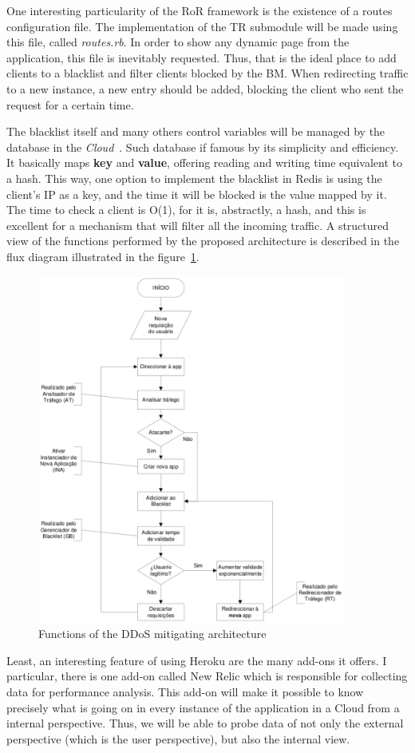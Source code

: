 One interesting particularity of the RoR framework is the existence of a routes configuration file. The implementation of the TR submodule will be made using this file, called \textit{routes.rb}. In order to show any dynamic page from the application, this file is inevitably requested. Thus, that is the ideal place to add clients to a blacklist and filter clients blocked by the BM. When redirecting traffic to a new instance, a new entry should be added, blocking the client who sent the request for a certain time.

The blacklist itself and many others control variables will be managed by the database in the \emph{Cloud}~\cite{redis}. Such database if famous by its simplicity and efficiency. It basically maps \textbf{key} and \textbf{value}, offering reading and writing time equivalent to a hash. This way, one option to implement the blacklist in Redis is using the client's IP as a key, and the time it will be blocked is the value mapped by it. The time to check a client is O(1), for it is, abstractly, a hash, and this is excellent for a mechanism that will filter all the incoming traffic. A structured view of the functions performed by the proposed architecture is described in the flux diagram illustrated in the figure~\ref{fig:dfd}.

\begin{figure}[t!]
	\centering
	\includegraphics[width=0.90\textwidth]{images/dfd.eps}
	\hskip 1cm
	\caption{Functions of the DDoS mitigating architecture}
	\label{fig:dfd}
\end{figure}

Least, an interesting feature of using Heroku are the many add-ons it offers. I particular, there is one add-on called New Relic which is responsible for collecting data for performance analysis. This add-on will make it possible to know precisely what is going on in every instance of the application in a Cloud from a internal perspective. Thus, we will be able to probe data of not only the external perspective (which is the user perspective), but also the internal view.